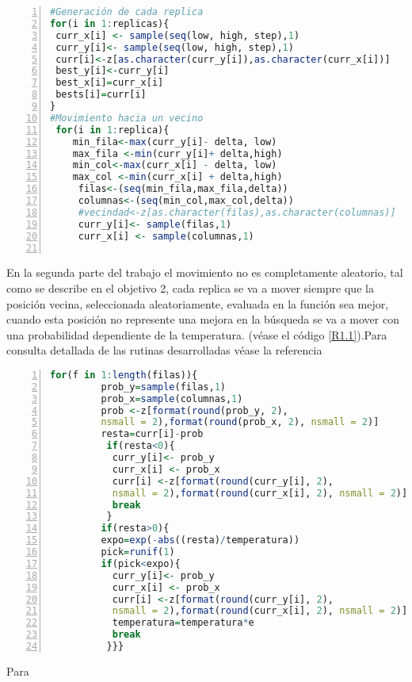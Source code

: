 \documentclass{article}
\begin{document}
\lstset{basicstyle=\ttfamily, keywordstyle=\bfseries}
\begin{lstlisting}[frame=single,numbers=left,language=R,caption=Generación de cada replica y movimiento aleatorio hacia los vecinos \label{R1}]
#Generación de cada replica
for(i in 1:replicas){
 curr_x[i] <- sample(seq(low, high, step),1)
 curr_y[i]<- sample(seq(low, high, step),1)
 curr[i]<-z[as.character(curr_y[i]),as.character(curr_x[i])]
 best_y[i]<-curr_y[i]
 best_x[i]=curr_x[i]
 bests[i]=curr[i]
}
#Movimiento hacia un vecino
 for(i in 1:replica){
    min_fila<-max(curr_y[i]- delta, low)
    max_fila <-min(curr_y[i]+ delta,high)
    min_col<-max(curr_x[i] - delta, low)
    max_col <-min(curr_x[i] + delta,high)
     filas<-(seq(min_fila,max_fila,delta))  
     columnas<-(seq(min_col,max_col,delta)) 
     #vecindad<-z[as.character(filas),as.character(columnas)]          
     curr_y[i]<- sample(filas,1)
     curr_x[i] <- sample(columnas,1)


\end{lstlisting}  
En la segunda parte del trabajo el movimiento no es completamente aleatorio, tal como se describe en el objetivo 2, cada replica se va a mover siempre que la posición vecina, seleccionada aleatoriamente, evaluada en la función sea mejor, cuando esta posición no represente una mejora en la búsqueda se va a mover con una probabilidad dependiente de la temperatura. (véase el código \ref{R1.1}).Para consulta detallada de las rutinas desarrolladas véase la referencia \citep{REPOP6}
\lstset{basicstyle=\ttfamily, keywordstyle=\bfseries}
\begin{lstlisting}[frame=single,numbers=left,language=R,caption=Selección de un vecino con una probabilidad dependiente de la temperatura si el valor del vecino seleccionado no es mejor. \label{R1.1}]
 for(f in 1:length(filas)){
         prob_y=sample(filas,1)
         prob_x=sample(columnas,1)
         prob <-z[format(round(prob_y, 2), 
         nsmall = 2),format(round(prob_x, 2), nsmall = 2)] 
         resta=curr[i]-prob
          if(resta<0){        
           curr_y[i]<- prob_y
           curr_x[i] <- prob_x
           curr[i] <-z[format(round(curr_y[i], 2), 
           nsmall = 2),format(round(curr_x[i], 2), nsmall = 2)]
           break  
          }
         if(resta>0){
         expo=exp(-abs((resta)/temperatura))
         pick=runif(1)
         if(pick<expo){        
           curr_y[i]<- prob_y
           curr_x[i] <- prob_x
           curr[i] <-z[format(round(curr_y[i], 2),
           nsmall = 2),format(round(curr_x[i], 2), nsmall = 2)] 
           temperatura=temperatura*e
           break
          }}}

\end{lstlisting}
Para 
\end{document}
